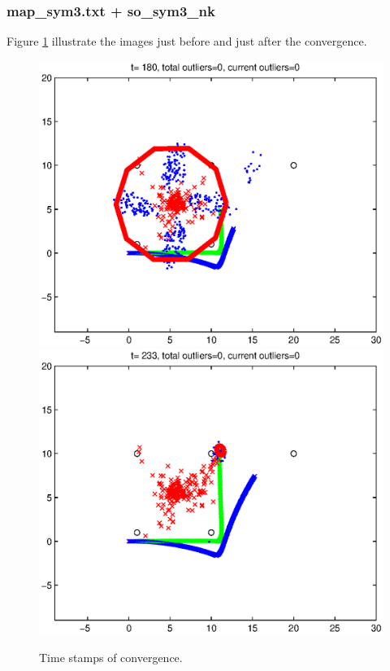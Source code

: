\documentclass[11pt,a4paper]{article}
\begin{document}
\subsubsection{map\_sym3.txt + so\_sym3\_nk}
\par Figure \ref{fig:converge_Map_3_M_10000} illustrate the images just before and just after the convergence.
\begin{figure}[!ht]
	\centering
	\includegraphics[scale=0.5]{./Figure/M=10000/2.eps}
	\includegraphics[scale=0.5]{./Figure/M=10000/4.eps}
	\caption{Time stamps of convergence.}
	\label{fig:converge_Map_3_M_10000}
\end{figure}
\end{document}
